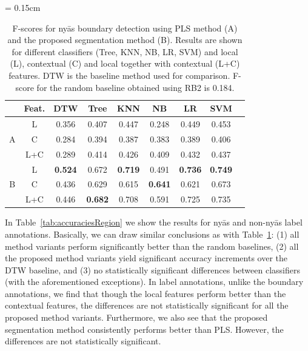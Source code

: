 \begin{table} 
	\centering
	\tabcolsep = 0.15cm
	\renewcommand{\arraystretch}{1.15}
	\begin{tabular}{ c|c|c| c c c c c c }
		
		\hline\hline
		& Feat.		&	DTW & Tree	 &	KNN 	&	NB		& LR 	&	SVM\\
		
		\hline
		\multirow{3}{*}{A} & 	L		&  0.356 & 0.407 & 0.447 & 0.248 & 0.449 & 0.453\\ 
		&	C		& 0.284 & 0.394 & 0.387 & 0.383 & 0.389 & 0.406 \\
		&	L+C		& 0.289 & 0.414 & 0.426 & 0.409 &0.432 & 0.437 \\
		\hline  		
		\multirow{3}{*}{B} &	L		& \textbf{0.524} & 0.672 & \textbf{0.719} & 0.491 & \textbf{0.736} & \textbf{0.749}\\ 
		&	C		& 0.436 & 0.629 & 0.615 & \textbf{0.641} & 0.621 & 0.673 \\
		&	L+C		& 0.446 & \textbf{0.682} & 0.708 & 0.591 & 0.725 & 0.735\\  		
		\hline\hline
		
	\end{tabular}
	
	\caption{F-scores for ny\={a}s boundary detection using PLS method (A) and the proposed segmentation method (B). Results are shown for different classifiers (Tree, KNN, NB, LR, SVM) and local (L), contextual (C) and local together with contextual (L+C) features. DTW is the baseline method used for comparison. F-score for the random baseline obtained using RB2 is 0.184. }
	\label{tab:accuraciesboundary}
\end{table}

In Table~\ref{tab:accuraciesRegion} we show the results for ny\={a}s and non-ny\={a}s label annotations. Basically, we can draw similar conclusions as with Table~\ref{tab:accuraciesboundary}: (1) all method variants perform significantly better than the random baselines, (2) all the proposed method variants yield significant accuracy increments over the DTW baseline, and (3) no statistically significant differences between classifiers (with the aforementioned exceptions). In label annotations, unlike the boundary annotations, we find that though the local features perform better than the contextual features, the differences are not statistically significant for all the proposed method variants. Furthermore, we also see that the proposed segmentation method consistently performs  better than PLS. However, the differences are not statistically significant.

